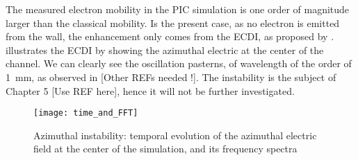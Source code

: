   The measured electron mobility in the \ac{PIC} simulation is one order of magnitude larger than the classical mobility.
  Is the present case, as no electron is emitted from the wall, the enhancement only comes from the \ac{ECDI}, as proposed by \citet{lafleur2016} .
   illustrates the \ac{ECDI} by showing the azimuthal electric at the center of the channel.
  We can clearly see the oscillation pasterns, of wavelength of the order of 1~mm, as observed in \citet{heron2013,janhunen2018} [Other REFs needed !].
  The instability is the subject of Chapter 5 [Use REF here], hence it will not be further investigated.
  
  
  \begin{figure}[hbtp]
    \centering
    \texttt{[image: time\_and\_FFT]}
    \caption{Azimuthal instability: temporal evolution of the azimuthal electric field at the center of the simulation, and its frequency spectra }
    \label{fig-exampleECDI}
  \end{figure}

  
  